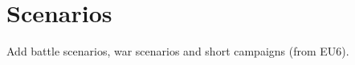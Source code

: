 
\chapter{Scenarios}\label{chapter:Scenarios}

\begin{todo}
  Add battle scenarios, war scenarios and short campaigns (from EU6).
\end{todo}




